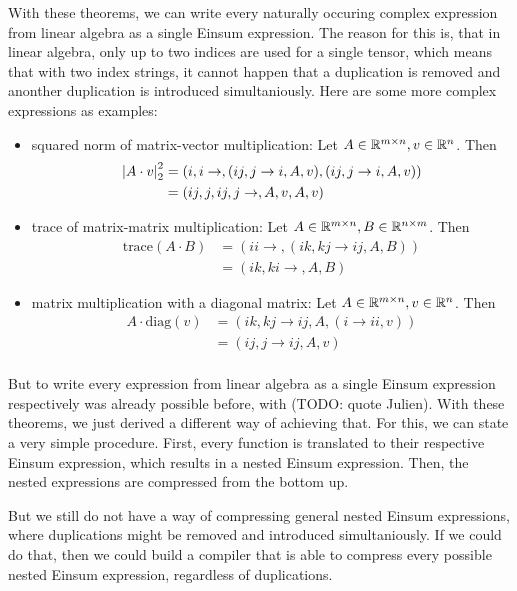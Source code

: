 With these theorems, we can write every naturally occuring complex expression from linear algebra as a single Einsum expression.
The reason for this is, that in linear algebra, only up to two indices are used for a single tensor,
which means that with two index strings, it cannot happen that a duplication is removed and anonther duplication is introduced simultaniously.
Here are some more complex expressions as examples:
\begin{itemize}
    \item squared norm of matrix-vector multiplication: Let $A \in \mathbb{R}^{m \times n}, v \in \mathbb{R}^{n}$. Then
          \begin{align*}
              \left| A \cdot v \right|_2^2 & = (i,i\rightarrow,(ij, j \rightarrow i, A, v),(ij, j \rightarrow i, A, v)) \\
                                  & = (ij,j,ij,j\rightarrow,A,v,A,v)
          \end{align*}
    \item trace of matrix-matrix multiplication: Let $A \in \mathbb{R}^{m \times n}, B \in \mathbb{R}^{n \times m}$. Then
          \begin{align*}
              \text{trace}(A \cdot B) & = (ii \rightarrow, (ik, kj \rightarrow ij, A, B)) \\
                                      & = (ik, ki \rightarrow, A, B)
          \end{align*}
    \item matrix multiplication with a diagonal matrix: Let $A \in \mathbb{R}^{m \times n}, v \in \mathbb{R}^{n}$. Then
          \begin{align*}
              A \cdot \text{diag}(v) & = (ik, kj \rightarrow ij, A, (i \rightarrow ii, v)) \\
                                     & = (ij, j \rightarrow ij, A, v)                      \\
          \end{align*}
\end{itemize}

But to write every expression from linear algebra as a single Einsum expression respectively was already possible before, with (TODO: quote Julien).
With these theorems, we just derived a different way of achieving that.
For this, we can state a very simple procedure.
First, every function is translated to their respective Einsum expression, which results in a nested Einsum expression.
Then, the nested expressions are compressed from the bottom up.

But we still do not have a way of compressing general nested Einsum expressions, where duplications might be removed and introduced simultaniously.
If we could do that, then we could build a compiler that is able to compress every possible nested Einsum expression, regardless of duplications.


